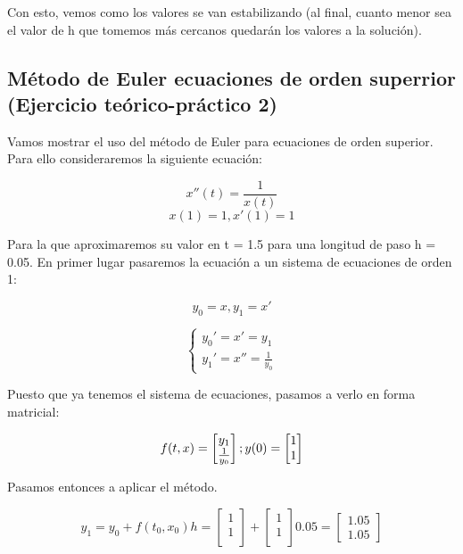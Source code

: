 \documentclass[12pt]{article}       %
\begin{document}
Con esto, vemos como los valores se van estabilizando (al final, cuanto menor sea el valor de h que tomemos más cercanos quedarán los valores a la solución).

\subsection{Método de Euler ecuaciones de orden superrior (Ejercicio teórico-práctico 2)}

Vamos mostrar el uso del método de Euler para ecuaciones de orden superior. Para ello consideraremos la siguiente ecuación:%

$$x''(t) = \frac{1}{x(t)}$$
$$ x(1) = 1, x'(1) = 1$$

Para la que aproximaremos su valor en t = 1.5 para una longitud de paso h = 0.05. En primer lugar pasaremos la ecuación a un sistema de ecuaciones de orden 1:

$$ y_0 = x, y_1 = x' $$

$$ 
\begin{cases}
y_0' = x' = y_1\\
y_1' = x'' = \frac{1}{y_0}
\end{cases}
$$

Puesto que ya tenemos el sistema de ecuaciones, pasamos a verlo en forma matricial:

\begin{equation*}
f(t,x)=\begin{bmatrix}
 y_1 \\
 \frac{1}{y_0}\\
\end{bmatrix};\\
y(0)=\begin{bmatrix}
1 \\
1
\end{bmatrix}
\end{equation*}

Pasamos entonces a aplicar el método.

\begin{equation*}
y_1=y_0+f(t_0,x_0)h=\begin{bmatrix}
1\\
1\\
\end{bmatrix} + \begin{bmatrix}
1\\
1\\
\end{bmatrix}0.05=\begin{bmatrix}
1.05\\
1.05
\end{bmatrix}  
\end{equation*}
\end{document}
